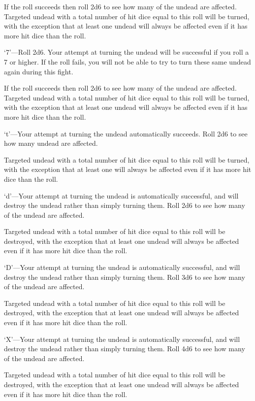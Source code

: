 \begin{multicols*}{2}
If the roll succeeds then roll 2d6 to see how many of the undead are affected. Targeted undead with a total number of hit dice equal to this roll will be turned, with the exception that at least one undead will always be affected even if it has more hit dice than the roll.

‘7’—Roll 2d6. Your attempt at turning the undead will be successful if you roll a 7 or higher. If the roll fails, you will not be able to try to turn these same undead again during this fight.

If the roll succeeds then roll 2d6 to see how many of the undead are affected. Targeted undead with a total number of hit dice equal to this roll will be turned, with the exception that at least one undead will always be affected even if it has more hit dice than the roll.

‘t’—Your attempt at turning the undead automatically succeeds. Roll 2d6 to see how many undead are affected.

Targeted undead with a total number of hit dice equal to this roll will be turned, with the exception that at least one will always be affected even if it has more hit dice than the roll.

‘d’—Your attempt at turning the undead is automatically successful, and will destroy the undead rather than simply turning them. Roll 2d6 to see how many of the undead are affected.

Targeted undead with a total number of hit dice equal to this roll will be destroyed, with the exception that at least one undead will always be affected even if it has more hit dice than the roll.

‘D’—Your attempt at turning the undead is automatically successful, and will destroy the undead rather than simply turning them. Roll 3d6 to see how many of the undead are affected.

Targeted undead with a total number of hit dice equal to this roll will be destroyed, with the exception that at least one undead will always be affected even if it has more hit dice than the roll.

‘X’—Your attempt at turning the undead is automatically successful, and will destroy the undead rather than simply turning them. Roll 4d6 to see how many of the undead are affected.

Targeted undead with a total number of hit dice equal to this roll will be destroyed, with the exception that at least one undead will always be affected even if it has more hit dice than the roll.


\end{multicols*}
